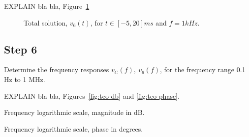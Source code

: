 {\color{red}
\Huge EXPLAIN
}
bla bla, Figure~\ref{fig:v6}


\begin{figure}[ht!]
  \centering
  \caption{Total solution, $v_{6}(t)$, for $t\in [-5,20]ms$ and $f=1kHz$.}
  \label{fig:v6}
\end{figure}
\FloatBarrier





\subsection{Step 6}
Determine the frequency responses $v_C(f),\ v_6(f)$, for the frequency range 0.1 Hz to 1 MHz.

{\color{red}
\Huge EXPLAIN
}
bla bla, Figures~\ref{fig:teo-db} and \ref{fig:teo-phase}.


\begin{minipage}[b]{0.48\textwidth}
\centering
    \captionsetup{type=figure}
\caption{Frequency logarithmic scale, magnitude in dB.}
\label{fig:teo-db}
\end{minipage}
\begin{minipage}[b]{0.48\textwidth}
\centering
    \captionsetup{type=figure}
  \caption{Frequency logarithmic scale, phase in degrees.}
  \label{fig:teo-phase}
\end{minipage}
